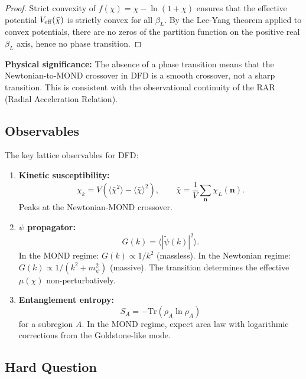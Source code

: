 \documentclass[11pt,a4paper]{article}
\begin{document}
\begin{proof}
Strict convexity of $f(\chi) = \chi - \ln(1+\chi)$ ensures that the effective potential $V_{\rm eff}(\bar\chi)$ is strictly convex for all $\beta_L$. By the Lee-Yang theorem applied to convex potentials, there are no zeros of the partition function on the positive real $\beta_L$ axis, hence no phase transition.
\end{proof}

\textbf{Physical significance:} The absence of a phase transition means that the Newtonian-to-MOND crossover in DFD is a smooth crossover, not a sharp transition. This is consistent with the observational continuity of the RAR (Radial Acceleration Relation).

\subsection{Observables}

The key lattice observables for DFD:

\begin{enumerate}
\item \textbf{Kinetic susceptibility:}
\begin{equation}
\chi_k = V\left(\langle\bar\chi^2\rangle - \langle\bar\chi\rangle^2\right), \qquad \bar\chi = \frac{1}{V}\sum_{\mathbf{n}}\chi_L(\mathbf{n}).
\end{equation}
Peaks at the Newtonian-MOND crossover.

\item \textbf{$\psi$ propagator:}
\begin{equation}
G(k) = \langle|\tilde\psi(k)|^2\rangle.
\end{equation}
In the MOND regime: $G(k) \propto 1/k^2$ (massless). In the Newtonian regime: $G(k) \propto 1/(k^2 + m_\psi^2)$ (massive). The transition determines the effective $\mu(\chi)$ non-perturbatively.

\item \textbf{Entanglement entropy:}
\begin{equation}
S_A = -\text{Tr}(\rho_A\ln\rho_A)
\end{equation}
for a subregion $A$. In the MOND regime, expect area law with logarithmic corrections from the Goldstone-like mode.
\end{enumerate}

\subsection{Hard Question}
\end{document}
